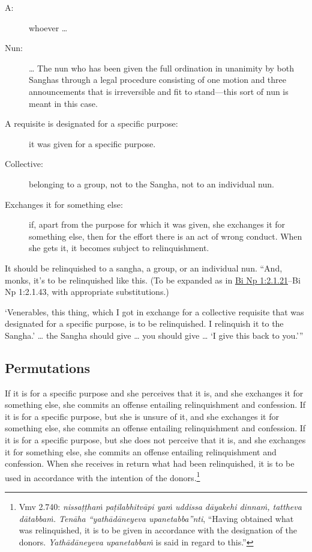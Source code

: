 \documentclass[12pt,openany]{book}%
\begin{document}
\begin{description}%
\item[A: ] whoever … %
\item[Nun: ] … The nun who has been given the full ordination in unanimity by both Sanghas through a legal procedure consisting of one motion and three announcements that is irreversible and fit to stand—this sort of nun is meant in this case. %
\item[A requisite is designated for a specific purpose: ] it was given for a specific purpose. %
\item[Collective: ] belonging to a group, not to the Sangha, not to an individual nun. %
\item[Exchanges it for something else: ] if, apart from the purpose for which it was given, she exchanges it for something else, then for the effort there is an act of wrong conduct. When she gets it, it becomes subject to relinquishment. %
\end{description}

It should be relinquished to a sangha, a group, or an individual nun. “And, monks, it’s to be relinquished like this.  (To be expanded as in \href{https://suttacentral.net/pli-tv-bi-vb-np1/en/brahmali\#2.1.21}{Bi Np 1:2.1.21}–Bi Np 1:2.1.43, with appropriate substitutions.) 

‘Venerables, this thing, which I got in exchange for a collective requisite that was designated for a specific purpose, is to be relinquished. I relinquish it to the Sangha.’ … the Sangha should give … you should give … ‘I give this back to you.’” 

\subsection*{Permutations }

If it is for a specific purpose and she perceives that it is, and she exchanges it for something else, she commits an offense entailing relinquishment and confession. If it is for a specific purpose, but she is unsure of it, and she exchanges it for something else, she commits an offense entailing relinquishment and confession. If it is for a specific purpose, but she does not perceive that it is, and she exchanges it for something else, she commits an offense entailing relinquishment and confession. When she receives in return what had been relinquished, it is to be used in accordance with the intention of the donors.\footnote{Vmv 2.740: \textit{\textsanskrit{nissaṭṭhaṁ} \textsanskrit{paṭilabhitvāpi} \textsanskrit{yaṁ} uddissa \textsanskrit{dāyakehi} \textsanskrit{dinnaṁ}, tattheva \textsanskrit{dātabbaṁ}. \textsanskrit{Tenāha} “\textsanskrit{yathādāneyeva} upanetabba”nti}, “Having obtained what was relinquished, it is to be given in accordance with the designation of the donors. \textit{\textsanskrit{Yathādāneyeva} \textsanskrit{upanetabbaṁ}} is said in regard to this.” } 
\end{document}
